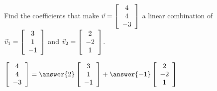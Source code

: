 \documentclass{ximera}
\author{Zack Reed}
\begin{document}
\begin{exercise}
  Find the coefficients that make $\vec{v}= \startmat{c}
    4 \\
    4 \\
    -3
  \stopmat$ a linear combination of $\vec{v}_1 = \startmat{c}
    3 \\
    1 \\
    -1
  \stopmat$ and $\vec{v}_2 = \startmat{c}
    2 \\
    -2 \\
    1
  \stopmat$.


    $\startmat{c}
      4 \\
      4 \\
      -3
    \stopmat = \answer{2} \startmat{c}
      3 \\
      1 \\
      -1
    \stopmat + \answer{-1} \startmat{c}
      2 \\
      -2 \\
      1
    \stopmat
    $
  
\end{exercise}
\end{document}
